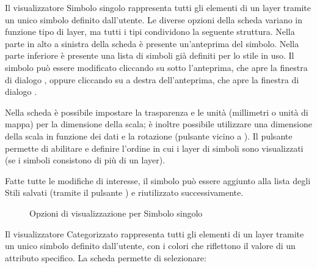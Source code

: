 
Il visualizzatore Simbolo singolo rappresenta tutti gli elementi di un layer 
tramite un unico simbolo definito dall'utente. Le diverse opzioni della scheda  
variano in funzione tipo di layer, ma tutti i tipi condividono la seguente struttura. 
Nella parte in alto a sinistra della scheda è presente un'anteprima del simbolo. Nella 
parte inferiore è presente una lista di simboli già definiti per lo stile in uso. 
Il simbolo può essere modificato cliccando su  sotto l'anteprima, 
che apre la finestra di dialogo , oppure cliccando su  
a destra dell'anteprima, che apre la finestra di dialogo . 

Nella scheda  è possibile impostare la trasparenza e le unità (millimetri o unità 
di mappa) per la dimensione della scala; è inoltre possibile utilizzare una dimensione della 
scala in funzione dei dati e la rotazione (pulsante  vicino a ). 
Il pulsante  permette di abilitare e definire l'ordine in cui i layer di simboli 
sono visualizzati (se i simboli consistono di più di un layer).

Fatte tutte le modifiche di interesse, il simbolo può essere aggiunto alla lista degli Stili salvati 
(tramite il pulsante ) e riutilizzato successivamente.

\begin{figure}[ht]
\centering
   \hspace{1cm}
   \hspace{1cm}
\caption{Opzioni di visualizzazione per Simbolo singolo \wincaption}
\end{figure}


Il visualizzatore Categorizzato rappresenta tutti gli elementi di un layer 
tramite un unico simbolo definito dall'utente, con i colori che riflettono 
il valore di un attributo specifico. La scheda  permette di selezionare:

